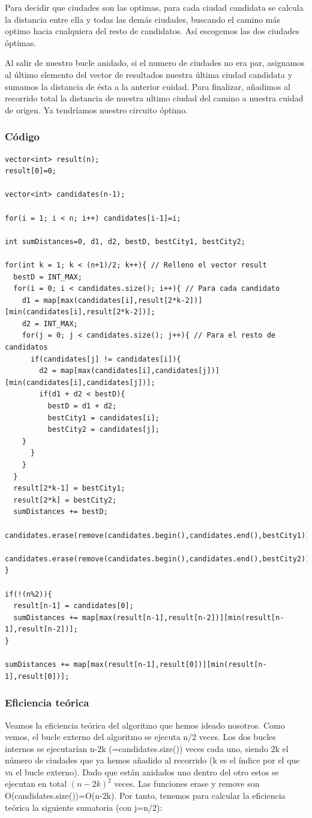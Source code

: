 \documentclass[a4]{article}
\begin{document}
Para decidir que ciudades son las optimas, para cada ciudad
candidata se calcula la distancia entre ella y todas las demás ciudades, buscando el camino más optimo hacia cualquiera del resto de candidatos. Así escogemos las dos ciudades óptimas.

Al salir de nuestro bucle anidado, si el numero de ciudades no era
par, asignamos al último elemento del vector de resultados nuestra
última ciudad candidata y sumamos la distancia de ésta a la anterior
cuidad.  Para finalizar, añadimos al recorrido total la distancia de
nuestra ultimo ciudad del camino a nuestra cuidad de origen. Ya
tendríamos nuestro circuito óptimo.

\subsubsection{Código}

\begin{lstlisting}
vector<int> result(n);
result[0]=0;

vector<int> candidates(n-1);

for(i = 1; i < n; i++) candidates[i-1]=i;

int sumDistances=0, d1, d2, bestD, bestCity1, bestCity2;

for(int k = 1; k < (n+1)/2; k++){ // Relleno el vector result
  bestD = INT_MAX;
  for(i = 0; i < candidates.size(); i++){ // Para cada candidato
    d1 = map[max(candidates[i],result[2*k-2])][min(candidates[i],result[2*k-2])];
    d2 = INT_MAX;
    for(j = 0; j < candidates.size(); j++){ // Para el resto de candidatos
      if(candidates[j] != candidates[i]){
        d2 = map[max(candidates[i],candidates[j])][min(candidates[i],candidates[j])];
        if(d1 + d2 < bestD){
          bestD = d1 + d2;
          bestCity1 = candidates[i];
          bestCity2 = candidates[j];
	}
      }
    }
  }
  result[2*k-1] = bestCity1;
  result[2*k] = bestCity2;
  sumDistances += bestD;
  candidates.erase(remove(candidates.begin(),candidates.end(),bestCity1));
  candidates.erase(remove(candidates.begin(),candidates.end(),bestCity2));
}

if(!(n%2)){
  result[n-1] = candidates[0];
  sumDistances += map[max(result[n-1],result[n-2])][min(result[n-1],result[n-2])];
}

sumDistances += map[max(result[n-1],result[0])][min(result[n-1],result[0])];
\end{lstlisting}

\subsubsection{Eficiencia teórica}
Veamos la eficiencia teórica del algoritmo que hemos ideado
nosotros. Como vemos, el bucle externo del algoritmo se ejecuta n/2
veces. Los dos bucles internos se ejecutarían n-2k
(=candidates.size()) veces cada uno, siendo 2k el número de ciudades
que ya hemos añadido al recorrido (k es el índice por el que va el
bucle externo). Dado que están anidados uno dentro del otro estos se
ejecutan en total $(n-2k)^2$ veces. Las funciones erase y remove son
O(candidates.size())=O(n-2k). Por tanto, tenemos para calcular la
eficiencia teórica la siguiente sumatoria (con j=n/2):
\end{document}
